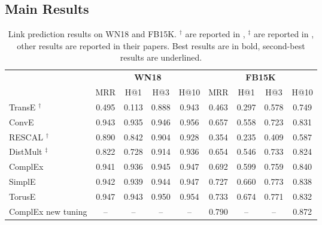 \documentclass{ecai}
\theoremstyle{plain}  \newtheorem{thm}{Theorem}  \newtheorem{lem}[thm]{Lemma}  \newtheorem{prop}[thm]{Proposition}
\theoremstyle{remark}  \newtheorem*{rem}{Remark}
\begin{document}
\subsection{Main Results} \label{sect:result} \begin{table*}[ht]


	\caption[Link prediction results on WN18 and FB15K.]{Link prediction results on WN18 and FB15K. $ ^\dagger $ are reported in \cite{nickel_holographicembeddingsknowledge_2016}, $ ^\ddagger $ are reported in \cite{trouillon_complexembeddingssimple_2016}, other results are reported in their papers. Best results are in bold, second-best results are underlined.}
	\label{tab:result}
	\centering
	\begin{adjustbox}{max width=\textwidth}
		\begin{tabular}{@{\extracolsep{2pt}}lcccccccc@{}}
			
			\toprule
			
			& \multicolumn{4}{c}{\textbf{WN18}} & \multicolumn{4}{c}{\textbf{FB15K}} \\
			\cmidrule(lr){2-5} \cmidrule(lr){6-9}
			& MRR & H@1 & H@3 & H@10 & MRR & H@1 & H@3 & H@10 \\ 
			\hline
			
TransE \cite{bordes_translatingembeddingsmodeling_2013} $ ^\dagger $ & 0.495 & 0.113 & 0.888 & 0.943 & 0.463 & 0.297 & 0.578 & 0.749 \\


ConvE \cite{dettmers_convolutional2dknowledge_2018} & 0.943 & 0.935 & 0.946 & 0.956 & 0.657 & 0.558 & 0.723 & 0.831 \\


RESCAL \cite{nickel_threewaymodelcollective_2011} $ ^\dagger $ & 0.890 & 0.842 & 0.904 & 0.928 & 0.354 & 0.235 & 0.409 & 0.587 \\
DistMult \cite{yang_embeddingentitiesrelations_2015} $ ^\ddagger $ &  0.822 & 0.728 & 0.914 & 0.936 & 0.654 & 0.546 & 0.733 & 0.824 \\
			ComplEx \cite{trouillon_complexembeddingssimple_2016} & 0.941 & 0.936 & 0.945 & 0.947 & 0.692 & 0.599 & 0.759 & 0.840 \\
			SimplE \cite{kazemi_simpleembeddinglink_2018} & 0.942 & 0.939 & 0.944 & 0.947 & 0.727 & 0.660 & 0.773 & 0.838  \\  
			
TorusE \cite{ebisu_toruseknowledgegraph_2018} & 0.947 & 0.943 & 0.950 & 0.954 & 0.733 & 0.674 & 0.771 & 0.832 \\
			ComplEx new tuning \cite{lerer_pytorchbiggraphlargescalegraph_2019} & -- & -- & -- & -- & 0.790 & -- & -- & 0.872 \\  


\end{tabular}
\end{adjustbox}
\end{table*}
\end{document}

